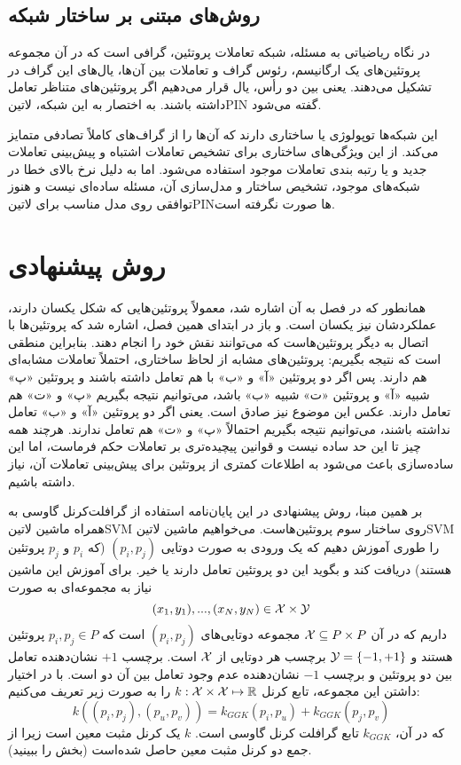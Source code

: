 \subsection{روش‌های مبتنی بر ساختار شبکه}
در نگاه ریاضیاتی به مسئله، شبکه تعاملات پروتئین، گرافی است که در آن مجموعه
پروتئین‌های یک ارگانیسم، رئوس گراف و تعاملات بین آن‌ها، یال‌های این گراف در تشکیل می‌دهند. یعنی بین دو رأس، یال قرار می‌دهیم اگر پروتئین‌های متناظر تعامل داشته باشند. به اختصار به این شبکه‌، ‌لاتین{PIN} گفته می‌شود.

این شبکه‌ها توپولوژی یا ساختاری دارند که آن‌ها را از گراف‌های کاملاً تصادفی متمایز می‌کند. از این ویژگی‌های ساختاری برای تشخیص تعاملات اشتباه و پیش‌بینی تعاملات جدید و یا رتبه بندی تعاملات موجود استفاده می‌شود. اما به دلیل نرخ بالای خطا در شبکه‌های موجود، تشخیص ساختار و مدل‌سازی آن، مسئله ساده‌ای نیست و هنوز توافقی روی مدل مناسب برای ‌لاتین{PIN}ها صورت نگرفته است.

\section{روش پیشنهادی}
همانطور که در فصل  به آن اشاره شد، معمولاً پروتئین‌هایی که شکل یکسان دارند، عملکردشان نیز یکسان است. و باز در ابتدای همین فصل، اشاره شد که پروتئین‌ها با اتصال به دیگر پروتئین‌هاست که می‌توانند نقش خود را انجام دهند. بنابراین منطقی است که نتیجه بگیریم: پروتئین‌های مشابه از لحاظ ساختاری، احتملاً تعاملات مشابه‌ای هم دارند. پس اگر دو پروتئین «آ» و «ب» با هم تعامل داشته باشند و پروتئین «پ» شبیه «آ» و پروتئین «ت» شبیه «ب» باشد، می‌توانیم نتیجه بگیریم «پ» و «ت» هم تعامل دارند. عکس این موضوع نیز صادق است. یعنی اگر دو پروتئین «آ» و «ب» تعامل نداشته باشند، می‌توانیم نتیجه بگیریم احتمالاً «پ» و «ت» هم تعامل ندارند. هرچند همه چیز تا این حد ساده نیست و قوانین پیچیده‌تری بر تعاملات حکم فرماست، اما این ساده‌سازی باعث می‌شود به اطلاعات کمتری از پروتئین برای پیش‌بینی تعاملات آن، نیاز داشته باشیم.

بر همین مبنا، روش پیشنهادی در این پایان‌نامه استفاده از گرافلت‌کرنل گاوسی به همراه ماشین ‌لاتین{SVM} روی ساختار سوم پروتئین‌هاست. می‌خواهیم ماشین ‌لاتین{SVM} را طوری آموزش دهیم که یک ورودی به صورت دوتایی $(p_i,p_j)$ (که $p_i$ و $p_j$ پروتئین هستند) دریافت کند و بگوید این دو پروتئین تعامل دارند یا خیر. برای آموزش این ماشین نیاز به مجموعه‌ای به صورت
\begin{equation*}
(x_1,y_1),...,(x_N,y_N) \in \mathcal{X} \times \mathcal{Y}
\end{equation*}
داریم که در آن $\mathcal{X} \subseteq P\times P$ مجموعه دوتایی‌های $(p_i,p_j)$ است که $p_i,p_j \in P$ پروتئین هستند و  $\mathcal{Y} = \left\lbrace-1,+1 \right\rbrace$ برچسب هر دوتایی از $\mathcal{X}$ است. برچسب $+1$ نشان‌دهنده تعامل بین دو پروتئین و برچسب $-1$ نشان‌دهنده عدم وجود تعامل بین آن دو است. با در اختیار داشتن این مجموعه، تابع کرنل $k: \mathcal{X}\times \mathcal{X} \mapsto \mathbb{R}$ را به صورت زیر تعریف می‌کنیم:
\begin{equation*}
k((p_i,p_j),(p_u,p_v)) = k_{GGK}(p_i,p_u) + k_{GGK}(p_j,p_v)
\end{equation*}
که در آن، $k_{GGK}$ تابع گرافلت کرنل گاوسی است. $k$ یک کرنل مثبت معین است زیرا از جمع دو کرنل مثبت معین حاصل شده‌است (بخش  را ببینید).

